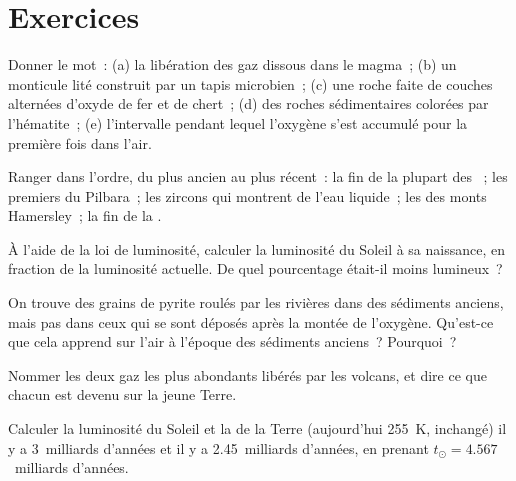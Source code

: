 \section{Exercices}

\begin{exercise}[$\star$]\label{exo:g12:early-earth:1}
Donner le mot~: (a) la libération des gaz dissous dans le magma~; (b) un
monticule lité construit par un tapis microbien~; (c) une roche faite de
couches alternées d'oxyde de fer et de chert~; (d) des roches
sédimentaires colorées par l'hématite~; (e) l'intervalle pendant lequel
l'oxygène s'est accumulé pour la première fois dans l'air.
\end{exercise}

\begin{exercise}[$\star$]\label{exo:g12:early-earth:2}
Ranger dans l'ordre, du plus ancien au plus récent~: la fin de la plupart
des ~; les premiers  du Pilbara~; les
zircons qui montrent de l'eau liquide~; les  des
monts Hamersley~; la fin de la .
\end{exercise}

\begin{exercise}[$\star$]\label{exo:g12:early-earth:3}
À l'aide de la loi de luminosité, calculer la luminosité du Soleil à sa
naissance, en fraction de la luminosité actuelle. De quel pourcentage
était-il moins lumineux~?
\end{exercise}

\begin{exercise}[$\star$]\label{exo:g12:early-earth:4}
On trouve des grains de pyrite roulés par les rivières dans des sédiments
anciens, mais pas dans ceux qui se sont déposés après la montée de
l'oxygène. Qu'est-ce que cela apprend sur l'air à l'époque des sédiments
anciens~? Pourquoi~?
\end{exercise}

\begin{exercise}[$\star$]\label{exo:g12:early-earth:5}
Nommer les deux gaz les plus abondants libérés par les volcans, et dire ce
que chacun est devenu sur la jeune Terre.
\end{exercise}

\begin{exercise}[$\star\star$]\label{exo:g12:early-earth:6}
Calculer la luminosité du Soleil et la  de la Terre
(aujourd'hui \qty{255}{K},  inchangé) il y a 3~milliards d'années et
il y a 2.45~milliards d'années, en prenant $t_\odot = 4.567$~milliards
d'années.
\end{exercise}


